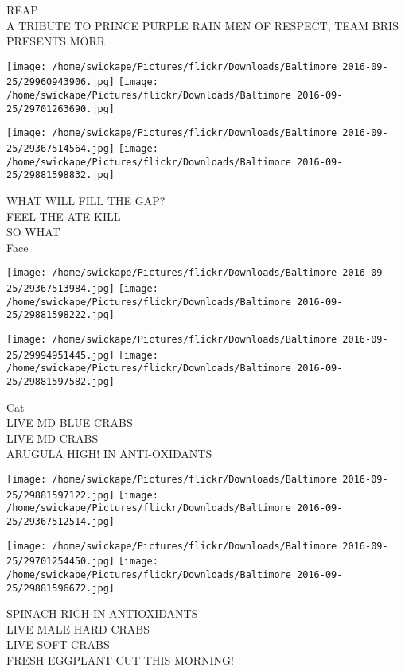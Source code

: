 \documentclass[10pt,letterpaper]{article}
\begin{document}
REAP\\
A TRIBUTE TO PRINCE PURPLE RAIN MEN OF RESPECT, TEAM BRIS PRESENTS MORR\\
\pagebreak

\texttt{[image: /home/swickape/Pictures/flickr/Downloads/Baltimore 2016-09-25/29960943906.jpg]}
\texttt{[image: /home/swickape/Pictures/flickr/Downloads/Baltimore 2016-09-25/29701263690.jpg]}

\texttt{[image: /home/swickape/Pictures/flickr/Downloads/Baltimore 2016-09-25/29367514564.jpg]}
\texttt{[image: /home/swickape/Pictures/flickr/Downloads/Baltimore 2016-09-25/29881598832.jpg]}

WHAT WILL FILL THE GAP?\\
FEEL THE ATE KILL\\
SO WHAT\\
Face\\
\pagebreak

\texttt{[image: /home/swickape/Pictures/flickr/Downloads/Baltimore 2016-09-25/29367513984.jpg]}
\texttt{[image: /home/swickape/Pictures/flickr/Downloads/Baltimore 2016-09-25/29881598222.jpg]}

\texttt{[image: /home/swickape/Pictures/flickr/Downloads/Baltimore 2016-09-25/29994951445.jpg]}
\texttt{[image: /home/swickape/Pictures/flickr/Downloads/Baltimore 2016-09-25/29881597582.jpg]}

Cat\\
LIVE MD BLUE CRABS\\
LIVE MD CRABS\\
ARUGULA HIGH! IN ANTI{-}OXIDANTS\\
\pagebreak

\texttt{[image: /home/swickape/Pictures/flickr/Downloads/Baltimore 2016-09-25/29881597122.jpg]}
\texttt{[image: /home/swickape/Pictures/flickr/Downloads/Baltimore 2016-09-25/29367512514.jpg]}

\texttt{[image: /home/swickape/Pictures/flickr/Downloads/Baltimore 2016-09-25/29701254450.jpg]}
\texttt{[image: /home/swickape/Pictures/flickr/Downloads/Baltimore 2016-09-25/29881596672.jpg]}

SPINACH RICH IN ANTIOXIDANTS\\
LIVE MALE HARD CRABS\\
LIVE SOFT CRABS\\
FRESH EGGPLANT CUT THIS MORNING!\\
\pagebreak
\end{document}
